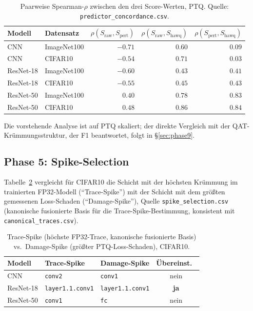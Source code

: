 \begin{table}[t]
\centering
\small
\caption{Paarweise Spearman-$\rho$ zwischen den drei Score-Werten, PTQ. Quelle: \texttt{predictor\_concordance.csv}.}
\label{tab:concordance}
\begin{tabular}{llrrr}
\toprule
Modell & Datensatz & $\rho(S_{\mathrm{raw}},S_{\mathrm{pert}})$ & $\rho(S_{\mathrm{raw}},S_{\mathrm{hawq}})$ & $\rho(S_{\mathrm{pert}},S_{\mathrm{hawq}})$ \\
\midrule
CNN & ImageNet100 & $-0.71$ & $0.60$ & $0.09$ \\
CNN & CIFAR10 & $-0.54$ & $0.71$ & $0.03$ \\
ResNet-18 & ImageNet100 & $-0.60$ & $0.43$ & $0.41$ \\
ResNet-18 & CIFAR10 & $-0.55$ & $0.45$ & $0.43$ \\
ResNet-50 & ImageNet100 & $0.40$ & $0.78$ & $\mathbf{0.83}$ \\
ResNet-50 & CIFAR10 & $0.48$ & $0.86$ & $\mathbf{0.84}$ \\
\bottomrule
\end{tabular}
\end{table}

Die vorstehende Analyse ist auf PTQ skaliert; der direkte Vergleich mit der QAT-Krümmungsstruktur, der F1 beantwortet, folgt in \S\ref{sec:phase9}.

\subsection{Phase 5: Spike-Selection}
\label{sec:phase5}

Tabelle~\ref{tab:spike} vergleicht für CIFAR10 die Schicht mit der höchsten Krümmung im trainierten FP32-Modell (\enquote{Trace-Spike}) mit der Schicht mit dem größten gemessenen Loss-Schaden (\enquote{Damage-Spike}), Quelle \texttt{spike\_selection.csv} (kanonische fusionierte Basis für die Trace-Spike-Bestimmung, konsistent mit \texttt{canonical\_traces.csv}).

\begin{table}[t]
\centering
\small
\caption{Trace-Spike (höchste FP32-Trace, kanonische fusionierte Basis) vs.\ Damage-Spike (größter PTQ-Loss-Schaden), CIFAR10.}
\label{tab:spike}
\begin{tabular}{lllc}
\toprule
Modell & Trace-Spike & Damage-Spike & Übereinst.\ \\
\midrule
CNN & \texttt{conv2} & \texttt{conv1} & nein \\
ResNet-18 & \texttt{layer1.1.conv1} & \texttt{layer1.1.conv1} & \textbf{ja} \\
ResNet-50 & \texttt{conv1} & \texttt{fc} & nein \\
\bottomrule
\end{tabular}
\end{table}

